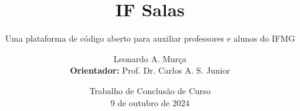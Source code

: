 \author[]{
    Leonardo A. Murça
    \vspace{1mm} \\ 
    \footnotesize {\textbf{Orientador:} Prof. Dr. Carlos A. S. Junior} \\
}

\title{\textbf{IF Salas}}
\subtitle{Uma plataforma de código aberto para auxiliar professores e alunos do IFMG}


\date[\small 9 de outubro de 2024]{
    \tiny {Trabalho de Conclusão de Curso} \\ 
    \tiny 9 de outubro de 2024 
}

\ifmglogo